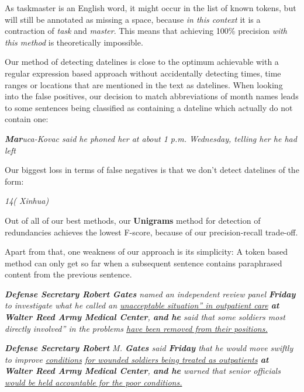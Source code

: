 \documentclass[a4paper,10pt]{scrartcl}
\theoremstyle{style}
\begin{document}
As taskmaster is an English word, it might occur in the list of known tokens, but will still be annotated as missing a space, because \textit{in this context} it is a contraction of \textit{task} and \textit{master}.
This means that achieving 100\% precision \textit{with this method} is theoretically impossible.

Our method of detecting datelines is close to the optimum achievable with a regular expression based approach without accidentally detecting times, time ranges or locations that are mentioned in the text as datelines.
When looking into the false positives, our decision to match abbreviations of month names leads to some sentences being classified as containing a dateline which actually do not contain one:

\begin{framed}
\quad\textit{\textbf{Mar}uca-Kovac said he phoned her at about 1 p.m. Wednesday, telling her he had left}
\end{framed}



Our biggest loss in terms of false negatives is that we don't detect datelines of the form:

\begin{framed}
\quad\textit{14( Xinhua)}
\end{framed}

Out of all of our best methods, our \textbf{Unigrams} method for detection of redundancies achieves the lowest F-score, because of our precision-recall trade-off.

Apart from that, one weakness of our approach is its simplicity: A token based method can only get so far when a subsequent sentence contains paraphrased content from the previous sentence.
\newpage

\begin{framed}
\quad\textit{\textbf{Defense Secretary Robert Gates} named an independent review panel \textbf{Friday} to investigate what he called an \underline{unacceptable situation'' in outpatient care} \textbf{at Walter Reed Army Medical Center}, \textbf{and he} said that some soldiers most directly involved'' in the problems \underline{have been removed from their positions.}}

\quad\textit{\textbf{Defense Secretary Robert} M. \textbf{Gates} said \textbf{Friday} that he would move swiftly to improve \underline{conditions} \underline{for wounded soldiers being treated as outpatients} \textbf{at Walter Reed Army Medical Center}, \textbf{and he} warned that senior officials \underline{would be held accountable for the poor conditions.}}
\end{framed}
\end{document}
